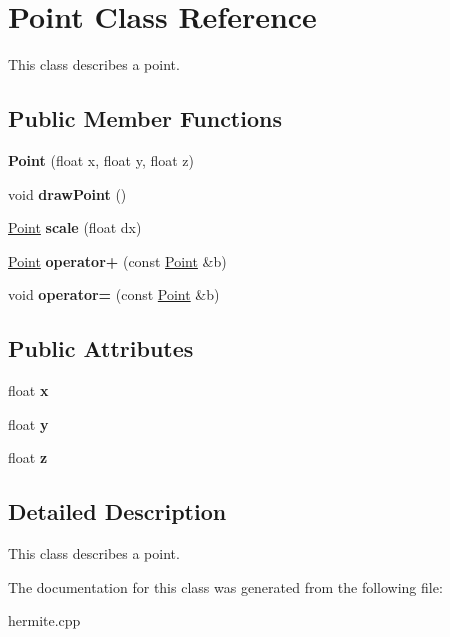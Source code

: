 \hypertarget{classPoint}{}\section{Point Class Reference}
\label{classPoint}


This class describes a point.  


\subsection*{Public Member Functions}
\begin{DoxyCompactItemize}
\item 
\mbox{\label{classPoint_a405838cb39b8fb6119633d9ba7e6b4fb}} 
{\bfseries Point} (float x, float y, float z)
\item 
\mbox{\label{classPoint_a82cbab503e5177f9fb4124536bea7c1b}} 
void {\bfseries draw\+Point} ()
\item 
\mbox{\label{classPoint_a0f158c73abd702cd759c7fdf30bd74ea}} 
\hyperlink{classPoint}{Point} {\bfseries scale} (float dx)
\item 
\mbox{\label{classPoint_aff2ca7ddd24aa68d296a8b69e089b316}} 
\hyperlink{classPoint}{Point} {\bfseries operator+} (const \hyperlink{classPoint}{Point} \&b)
\item 
\mbox{\label{classPoint_aa267cb24ea34ba8b71caffe4b7f3e39a}} 
void {\bfseries operator=} (const \hyperlink{classPoint}{Point} \&b)
\end{DoxyCompactItemize}
\subsection*{Public Attributes}
\begin{DoxyCompactItemize}
\item 
\mbox{\label{classPoint_a05dfe2dfbde813ad234b514f30e662f1}} 
float {\bfseries x}
\item 
\mbox{\label{classPoint_a6101960c8d2d4e8ea1d32c9234bbeb8d}} 
float {\bfseries y}
\item 
\mbox{\label{classPoint_a9a666531e0e99adff132be93d2407d0c}} 
float {\bfseries z}
\end{DoxyCompactItemize}


\subsection{Detailed Description}
This class describes a point. 

The documentation for this class was generated from the following file\+:\begin{DoxyCompactItemize}
\item 
hermite.\+cpp\end{DoxyCompactItemize}

